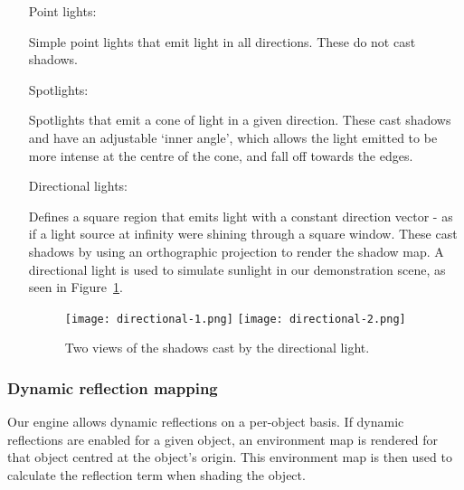\documentclass[11pt]{scrartcl} %
\begin{document}
            \begin{itemize}

            \item[Point lights:]

                Simple point lights that emit light in all directions. These do
                not cast shadows.

            \item[Spotlights:]

                Spotlights that emit a cone of light in a given direction.
                These cast shadows and have an adjustable `inner angle', which
                allows the light emitted to be more intense at the centre of
                the cone, and fall off towards the edges.

            \item[Directional lights:]

                Defines a square region that emits light with a constant
                direction vector - as if a light source at infinity were
                shining through a square window. These cast shadows by using an
                orthographic projection to render the shadow map. A directional
                light is used to simulate sunlight in our demonstration scene, as seen in Figure~\ref{fig:directional-light}.

                \begin{figure}%
                    \centering
                    \texttt{[image: directional-1.png]}
                    \texttt{[image: directional-2.png]}
                    \caption[Directional lights]{
                        Two views of the shadows cast by the directional light.
                    }
                    \label{fig:directional-light}
                \end{figure}

            \end{itemize}

        \subsubsection{Dynamic reflection mapping}

            Our engine allows dynamic reflections on a per-object basis. If
            dynamic reflections are enabled for a given object, an environment
            map is rendered for that object centred at the object's origin.
            This environment map is then used to calculate the reflection term
            when shading the object.
\end{document}
